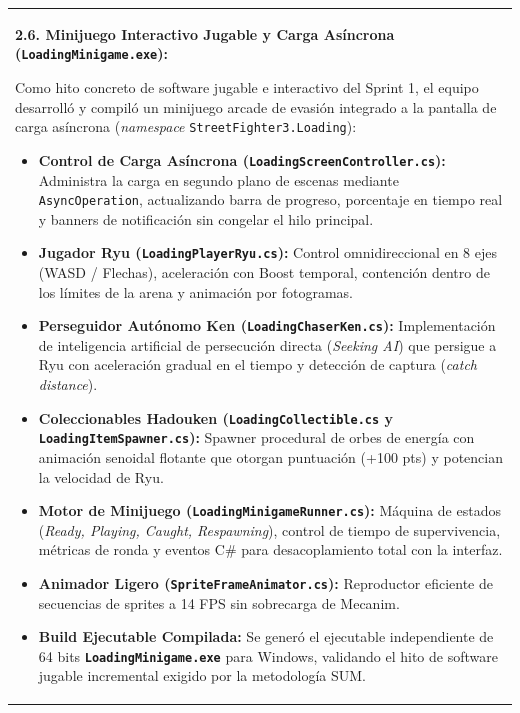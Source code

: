\documentclass[10pt,a4paper]{article}
\begin{document}
{\begin{tabularx}{\textwidth}{|X|}
{    \vspace{0.15cm}
    \textbf{2.6. Minijuego Interactivo Jugable y Carga Asíncrona (\texttt{LoadingMinigame.exe}):}\par
    Como hito concreto de software jugable e interactivo del Sprint 1, el equipo desarrolló y compiló un minijuego arcade de evasión integrado a la pantalla de carga asíncrona (\textit{namespace} \texttt{StreetFighter3.Loading}):
    \begin{itemize}[noitemsep,topsep=2pt]
        \item \textbf{Control de Carga Asíncrona (\texttt{LoadingScreenController.cs}):} Administra la carga en segundo plano de escenas mediante \texttt{AsyncOperation}, actualizando barra de progreso, porcentaje en tiempo real y banners de notificación sin congelar el hilo principal.
        \item \textbf{Jugador Ryu (\texttt{LoadingPlayerRyu.cs}):} Control omnidireccional en 8 ejes (WASD / Flechas), aceleración con Boost temporal, contención dentro de los límites de la arena y animación por fotogramas.
        \item \textbf{Perseguidor Autónomo Ken (\texttt{LoadingChaserKen.cs}):} Implementación de inteligencia artificial de persecución directa (\textit{Seeking AI}) que persigue a Ryu con aceleración gradual en el tiempo y detección de captura (\textit{catch distance}).
        \item \textbf{Coleccionables Hadouken (\texttt{LoadingCollectible.cs} y \texttt{LoadingItemSpawner.cs}):} Spawner procedural de orbes de energía con animación senoidal flotante que otorgan puntuación (+100 pts) y potencian la velocidad de Ryu.
        \item \textbf{Motor de Minijuego (\texttt{LoadingMinigameRunner.cs}):} Máquina de estados (\textit{Ready, Playing, Caught, Respawning}), control de tiempo de supervivencia, métricas de ronda y eventos C\# para desacoplamiento total con la interfaz.
        \item \textbf{Animador Ligero (\texttt{SpriteFrameAnimator.cs}):} Reproductor eficiente de secuencias de sprites a 14 FPS sin sobrecarga de Mecanim.
        \item \textbf{Build Ejecutable Compilada:} Se generó el ejecutable independiente de 64 bits \textbf{\texttt{LoadingMinigame.exe}} para Windows, validando el hito de software jugable incremental exigido por la metodología SUM.
    \end{itemize}

}
\end{tabularx}}
\end{document}
